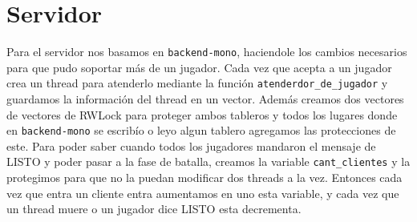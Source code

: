 \documentclass[hidelinks,a4paper,12pt, nofootinbib]{article}
\begin{document}
\section{Servidor}
Para el servidor nos basamos en \texttt{backend-mono}, haciendole los cambios necesarios para que pudo soportar más de un jugador. 
Cada vez que acepta a un jugador crea un thread para atenderlo mediante la función \texttt{atenderdor\_de\_jugador} y guardamos la información del thread en un vector. Además creamos dos vectores de vectores de RWLock para proteger ambos tableros y todos los lugares donde en \texttt{backend-mono} se escribío o leyo algun tablero agregamos las protecciones de este.
Para poder saber cuando todos los jugadores mandaron el mensaje de LISTO y poder pasar a la fase de batalla, creamos la variable \texttt{cant\_clientes} y la protegimos para que no la puedan modificar dos threads a la vez. Entonces cada vez que entra un cliente entra aumentamos en uno esta variable, y cada vez que un thread muere o un jugador dice LISTO esta decrementa.
\end{document}
